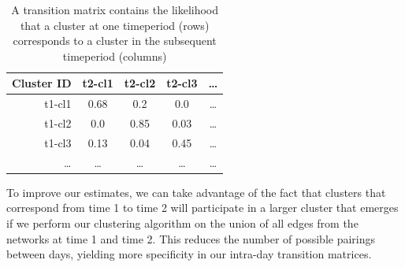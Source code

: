 \documentclass[12pt]{article}
\begin{document}
\begin{table}[h]
	\caption{A  transition  matrix  contains  the  likelihood  that  a  cluster  at  one  timeperiod  (rows)  corresponds  to  a cluster in the subsequent timeperiod (columns)}
	
	\begin{center}
	  \begin{tabular}{| r | c  c  c  c |}
	    \hline
	    Cluster ID & t2-cl1   & t2-cl2   & t2-cl3   & \ldots \\ \hline
	    t1-cl1     & 0.68     & 0.2      & 0.0      & \ldots \\ 
	    t1-cl2     & 0.0      & 0.85     & 0.03     & \ldots \\
	    t1-cl3     & 0.13     & 0.04     & 0.45     & \ldots \\
	    \ldots     & \ldots   & \ldots   & \ldots   & \ldots \\
	    \hline
	  \end{tabular}
	\end{center}
	\label{tab:transition_matrix}
\end{table}

To improve our estimates, we can take advantage of the fact that clusters that correspond from time 1 to time 2 will participate in a larger cluster that emerges if we perform our clustering algorithm on the union of all edges from the networks at time 1 and time 2. This reduces the number of possible pairings between days, yielding more specificity in our intra-day transition matrices.
\end{document}
